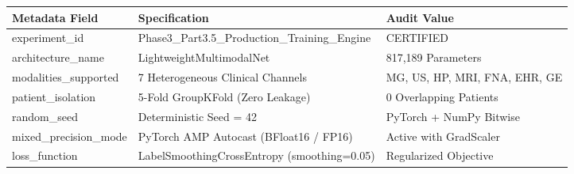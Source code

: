 \begin{tabular}{lll}
\toprule
Metadata Field & Specification & Audit Value \\
\midrule
experiment\_id & Phase3\_Part3.5\_Production\_Training\_Engine & CERTIFIED \\
architecture\_name & LightweightMultimodalNet & 817,189 Parameters \\
modalities\_supported & 7 Heterogeneous Clinical Channels & MG, US, HP, MRI, FNA, EHR, GE \\
patient\_isolation & 5-Fold GroupKFold (Zero Leakage) & 0 Overlapping Patients \\
random\_seed & Deterministic Seed = 42 & PyTorch + NumPy Bitwise \\
mixed\_precision\_mode & PyTorch AMP Autocast (BFloat16 / FP16) & Active with GradScaler \\
loss\_function & LabelSmoothingCrossEntropy (smoothing=0.05) & Regularized Objective \\
\bottomrule
\end{tabular}

